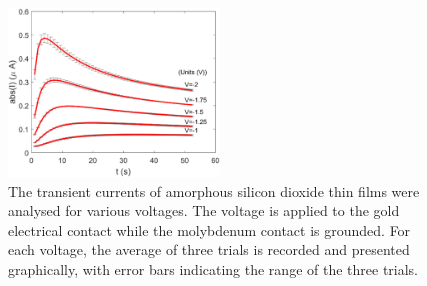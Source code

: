 

\begin{figure}[htbp!] 
\centering    
\includegraphics[width=0.5\textwidth]{Chapter3/Figs/3e.png}
\caption[The voltage dependence of the current transient in the subthreshold regime.]{The transient currents of amorphous silicon dioxide thin films were analysed for various voltages. The voltage is applied to the gold electrical contact while the molybdenum contact is grounded. For each voltage, the average of three trials is recorded and presented graphically, with error bars indicating the range of the three trials.}
\label{fig:3e}
\end{figure}

